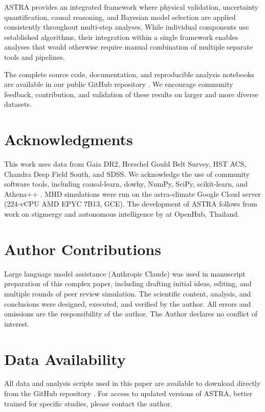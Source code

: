\documentclass[usenatbib]{rasti}
\begin{document}
ASTRA provides an integrated framework where physical validation, uncertainty quantification, causal reasoning, and Bayesian model selection are applied consistently throughout multi-step analyses. While individual components use established algorithms, their integration within a single framework enables analyses that would otherwise require manual combination of multiple separate tools and pipelines.

The complete source code, documentation, and reproducible analysis notebooks are available in our public GitHub repository \citep{astra_github}. We encourage community feedback, contribution, and validation of these results on larger and more diverse datasets.

\section*{Acknowledgments}

This work uses data from Gaia DR2, Herschel Gould Belt Survey, HST ACS, Chandra Deep Field South, and SDSS. We acknowledge the use of community software tools, including causal-learn, dowhy, NumPy, SciPy, scikit-learn, and Athena++ \citep{stone2020}. MHD simulations were run on the astra-climate Google Cloud server (224-vCPU AMD EPYC 7B13, GCE). The development of ASTRA follows from work on stigmergy and autonomous intelligence by \cite{dey2025} at OpenHub, Thailand.

\section*{Author Contributions}

Large language model assistance (Anthropic Claude) was used in manuscript preparation of this complex paper, including drafting initial ideas, editing, and multiple rounds of peer review simulation. The scientific content, analysis, and conclusions were designed, executed, and verified by the author. All errors and omissions are the responsibility of the author. The Author declares no conflict of interest.

\section*{Data Availability}

All data and analysis scripts used in this paper are available to download directly from the GitHub repository \citep{astra_github}. For access to updated versions of ASTRA, better trained for specific studies, please contact the author.

\label{lastpage}



\end{document}
